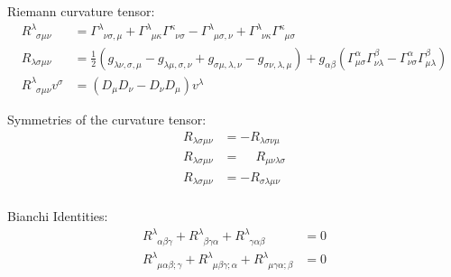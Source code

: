			\noindent
			Riemann curvature tensor:
			\begin{equation}
				\begin{aligned}
					R^{\lambda}_{\phantom{\lambda}\sigma\mu\nu} &= \Gamma^{\lambda}_{\phantom{\lambda}\nu\sigma,\mu}
					+ \Gamma^{\lambda}_{\phantom{\lambda}\mu\kappa}\Gamma^{\kappa}_{\phantom{\kappa}\nu\sigma}
					-
					\Gamma^{\lambda}_{\phantom{\lambda}\mu\sigma,\nu}
					+ \Gamma^{\lambda}_{\phantom{\lambda}\nu\kappa}\Gamma^{\kappa}_{\phantom{\kappa}\mu\sigma} \\
					R_{\lambda\sigma\mu\nu} &= \frac{1}{2}\left(
					g_{\lambda\nu,\sigma,\mu} - g_{\lambda\mu,\sigma,\nu} + g_{\sigma\mu,\lambda,\nu} -	 g_{\sigma\nu,\lambda,\mu}
					\right)
					+ g_{\alpha\beta} \left(
					\Gamma^{\alpha}_{\mu\sigma} \Gamma^{\beta}_{\nu\lambda} - \Gamma^{\alpha}_{\nu\sigma} \Gamma^{\beta}_{\mu\lambda}
					\right)
					\\
					R^{\lambda}_{\phantom{\lambda}\sigma\mu\nu}v^\sigma &= \left(D_\mu D_\nu - D_\nu D_\mu \right) v^\lambda
				\end{aligned}
			\end{equation}

			\noindent
			Symmetries of the curvature tensor:
			\begin{equation}
				\begin{aligned}
					R_{\lambda\sigma\mu\nu} &= - R_{\lambda\sigma\nu\mu} \\
					R_{\lambda\sigma\mu\nu} &= \phantom{-} R_{\mu\nu\lambda\sigma} \\
					R_{\lambda\sigma\mu\nu} &= - R_{\sigma\lambda\mu\nu} \\
				\end{aligned}
			\end{equation}

			\noindent
			Bianchi Identities:
			\begin{equation}
				\begin{aligned}
					R^{\lambda}_{\phantom{\lambda}\alpha\beta\gamma} + R^{\lambda}_{\phantom{\lambda}\beta\gamma\alpha} + R^{\lambda}_{\phantom{\lambda}\gamma\alpha\beta} &= 0 \\
					R^{\lambda}_{\phantom{\lambda}\mu\alpha\beta;\gamma} + R^{\lambda}_{\phantom{\lambda}\mu\beta\gamma;\alpha} + R^{\lambda}_{\phantom{\lambda}\mu\gamma\alpha;\beta} &= 0 \\
				\end{aligned}
			\end{equation}


